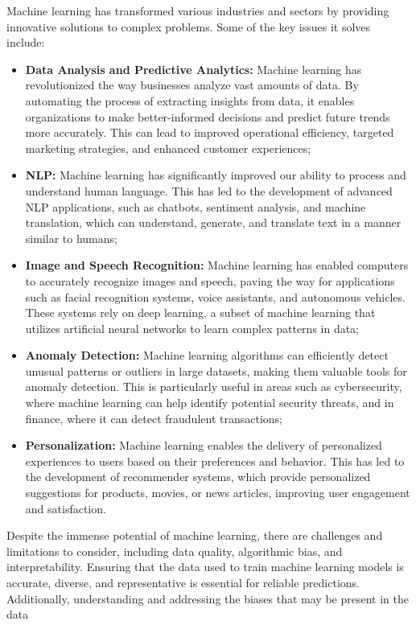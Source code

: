 Machine learning has transformed various industries and sectors by providing innovative solutions to complex problems.
Some of the key issues it solves include:

\begin{itemize}
    \item \textbf{Data Analysis and Predictive Analytics:} Machine learning has revolutionized the way businesses analyze vast amounts of data.
        By automating the process of extracting insights from data, it enables organizations to make better-informed decisions and predict future trends more accurately.
        This can lead to improved operational efficiency, targeted marketing strategies, and enhanced customer experiences;
    \item \textbf{\ac{NLP}:} Machine learning has significantly improved our ability to process and understand human language.
        This has led to the development of advanced NLP applications, such as chatbots, sentiment analysis, and machine translation, which can understand, generate, and translate text in a manner similar to humans;
    \item \textbf{Image and Speech Recognition:} Machine learning has enabled computers to accurately recognize images and speech, paving the way for applications such as facial recognition systems, voice assistants, and autonomous vehicles.
        These systems rely on deep learning, a subset of machine learning that utilizes artificial neural networks to learn complex patterns in data;
    \item \textbf{Anomaly Detection:} Machine learning algorithms can efficiently detect unusual patterns or outliers in large datasets, making them valuable tools for anomaly detection.
        This is particularly useful in areas such as cybersecurity, where machine learning can help identify potential security threats, and in finance, where it can detect fraudulent transactions;
    \item \textbf{Personalization:} Machine learning enables the delivery of personalized experiences to users based on their preferences and behavior.
        This has led to the development of recommender systems, which provide personalized suggestions for products, movies, or news articles, improving user engagement and satisfaction.
\end{itemize}

Despite the immense potential of machine learning, there are challenges and limitations to consider, including data quality, algorithmic bias, and interpretability.
Ensuring that the data used to train machine learning models is accurate, diverse, and representative is essential for reliable predictions.
Additionally, understanding and addressing the biases that may be present in the data
